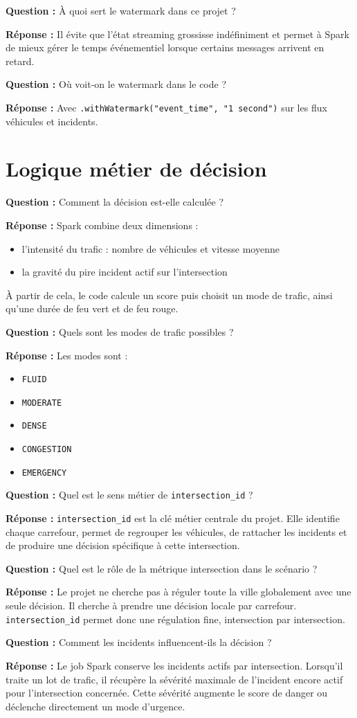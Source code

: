 \documentclass[11pt,a4paper]{article}
\newcommand{\question}[1]{
  \begin{questionbox}
  \textbf{Question :} #1
  \end{questionbox}
}
\newcommand{\reponse}{\textbf{Réponse : }}
\begin{document}
\question{À quoi sert le watermark dans ce projet ?}
\reponse Il évite que l'état streaming grossisse indéfiniment et permet à Spark de mieux gérer le temps événementiel lorsque certains messages arrivent en retard.

\question{Où voit-on le watermark dans le code ?}
\reponse Avec \texttt{.withWatermark("event\_time", "1 second")} sur les flux véhicules et incidents.

\section{Logique métier de décision}

\question{Comment la décision est-elle calculée ?}
\reponse Spark combine deux dimensions :
\begin{itemize}[leftmargin=1.4em]
  \item l'intensité du trafic : nombre de véhicules et vitesse moyenne
  \item la gravité du pire incident actif sur l'intersection
\end{itemize}
À partir de cela, le code calcule un score puis choisit un mode de trafic, ainsi qu'une durée de feu vert et de feu rouge.

\question{Quels sont les modes de trafic possibles ?}
\reponse Les modes sont :
\begin{itemize}[leftmargin=1.4em]
  \item \texttt{FLUID}
  \item \texttt{MODERATE}
  \item \texttt{DENSE}
  \item \texttt{CONGESTION}
  \item \texttt{EMERGENCY}
\end{itemize}

\question{Quel est le sens métier de \texttt{intersection\_id} ?}
\reponse \texttt{intersection\_id} est la clé métier centrale du projet. Elle identifie chaque carrefour, permet de regrouper les véhicules, de rattacher les incidents et de produire une décision spécifique à cette intersection.

\question{Quel est le rôle de la métrique intersection dans le scénario ?}
\reponse Le projet ne cherche pas à réguler toute la ville globalement avec une seule décision. Il cherche à prendre une décision locale par carrefour. \texttt{intersection\_id} permet donc une régulation fine, intersection par intersection.

\question{Comment les incidents influencent-ils la décision ?}
\reponse Le job Spark conserve les incidents actifs par intersection. Lorsqu'il traite un lot de trafic, il récupère la sévérité maximale de l'incident encore actif pour l'intersection concernée. Cette sévérité augmente le score de danger ou déclenche directement un mode d'urgence.
\end{document}
